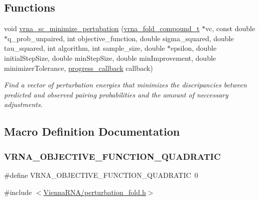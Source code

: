 \subsection*{Functions}
\begin{DoxyCompactItemize}
\item 
void \mbox{\hyperlink{group__perturbation_gaa124bdc20d88001c38ade590c4bcc3c4}{vrna\+\_\+sc\+\_\+minimize\+\_\+pertubation}} (\mbox{\hyperlink{group__fold__compound_ga1b0cef17fd40466cef5968eaeeff6166}{vrna\+\_\+fold\+\_\+compound\+\_\+t}} $\ast$vc, const double $\ast$q\+\_\+prob\+\_\+unpaired, int objective\+\_\+function, double sigma\+\_\+squared, double tau\+\_\+squared, int algorithm, int sample\+\_\+size, double $\ast$epsilon, double initial\+Step\+Size, double min\+Step\+Size, double min\+Improvement, double minimizer\+Tolerance, \mbox{\hyperlink{group__perturbation_gaa715397c7afd2d2955c315512a3d571a}{progress\+\_\+callback}} callback)
\begin{DoxyCompactList}\small\item\em Find a vector of perturbation energies that minimizes the discripancies between predicted and observed pairing probabilities and the amount of neccessary adjustments. \end{DoxyCompactList}\end{DoxyCompactItemize}


\subsection{Macro Definition Documentation}
\mbox{\label{group__perturbation_ga81e10993d1ae728e4e02022b33155a12}} 
\subsubsection{\texorpdfstring{VRNA\_OBJECTIVE\_FUNCTION\_QUADRATIC}{VRNA\_OBJECTIVE\_FUNCTION\_QUADRATIC}}
{\footnotesize\ttfamily \#define V\+R\+N\+A\+\_\+\+O\+B\+J\+E\+C\+T\+I\+V\+E\+\_\+\+F\+U\+N\+C\+T\+I\+O\+N\+\_\+\+Q\+U\+A\+D\+R\+A\+T\+IC~0}



{\ttfamily \#include $<$\mbox{\hyperlink{perturbation__fold_8h}{Vienna\+R\+N\+A/perturbation\+\_\+fold.\+h}}$>$}



